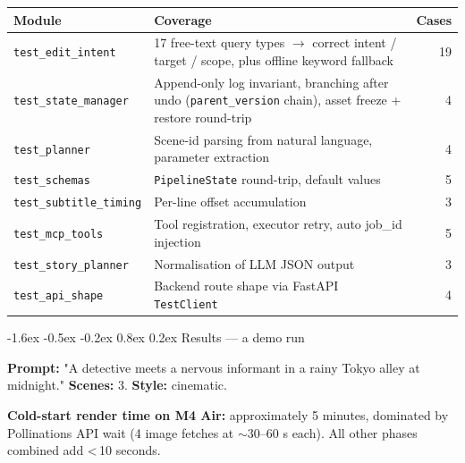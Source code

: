 \documentclass[11pt,a4paper]{article}
\makeatletter
\renewcommand\section{\@startsection{section}{1}{\z@}%
   {-1.6ex \@plus -0.5ex \@minus -0.2ex}%
   {0.8ex \@plus 0.2ex}%
   {\Large\bfseries\color{accent}}}
\newcommand{\code}[1]{\texttt{\small #1}}
\makeatother
\begin{document}
\begin{tabularx}{\textwidth}{l X r}
\toprule
\textbf{Module} & \textbf{Coverage} & \textbf{Cases} \\
\midrule
\code{test\_edit\_intent}      & 17 free-text query types $\rightarrow$ correct intent / target / scope, plus offline keyword fallback                                  & 19 \\
\code{test\_state\_manager}    & Append-only log invariant, branching after undo (\code{parent\_version} chain), asset freeze + restore round-trip                     & 4  \\
\code{test\_planner}           & Scene-id parsing from natural language, parameter extraction                                                                          & 4  \\
\code{test\_schemas}           & \code{PipelineState} round-trip, default values                                                                                       & 5  \\
\code{test\_subtitle\_timing}  & Per-line offset accumulation                                                                                                          & 3  \\
\code{test\_mcp\_tools}        & Tool registration, executor retry, auto job\_id injection                                                                             & 5  \\
\code{test\_story\_planner}    & Normalisation of LLM JSON output                                                                                                      & 3  \\
\code{test\_api\_shape}        & Backend route shape via FastAPI \code{TestClient}                                                                                     & 4  \\
\bottomrule
\end{tabularx}

\section{Results --- a demo run}

\textbf{Prompt:} "A detective meets a nervous informant in a rainy Tokyo alley
at midnight."  \textbf{Scenes:} 3.  \textbf{Style:} cinematic.

\smallskip
\textbf{Cold-start render time on M4 Air:} approximately 5 minutes, dominated
by Pollinations API wait (4 image fetches at $\sim$30--60 s each). All other
phases combined add \textless\,10 seconds.
\end{document}
